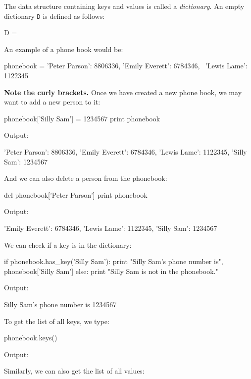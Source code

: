 The data structure containing keys and values is called a {\em dictionary}. 
An empty dictionary {\tt D} is defined as follows:

\begin{bluecode}
D = {}
\end{bluecode}
An example of a phone book would be:

\begin{bluecode}
phonebook = {'Peter Parson': 8806336, 'Emily Everett': 6784346, \
'Lewis Lame': 1122345}
\end{bluecode}
{\bf Note the curly brackets.} 
Once we have created a new phone book, we may want to add a new person to it:

\begin{bluecode}
phonebook['Silly Sam'] = 1234567
print phonebook
\end{bluecode}
Output:

\begin{bluecode}
{'Peter Parson': 8806336, 'Emily Everett': 6784346,
'Lewis Lame': 1122345, 'Silly Sam': 1234567}
\end{bluecode}
And we can also delete a person from the phonebook:

\begin{bluecode}
del phonebook['Peter Parson']
print phonebook
\end{bluecode}
Output:

\begin{bluecode}
{'Emily Everett': 6784346, 'Lewis Lame': 1122345, 
'Silly Sam': 1234567}
\end{bluecode}
We can check if a key is in the dictionary:

\begin{bluecode}
if phonebook.has_key('Silly Sam'):
    print "Silly Sam's phone number is", phonebook['Silly Sam']
else:
    print "Silly Sam is not in the phonebook."
\end{bluecode}
Output:

\begin{bluecode}
Silly Sam's phone number is 1234567
\end{bluecode}
To get the list of all keys, we type:

\begin{bluecode}
phonebook.keys()
\end{bluecode}
Output:

\begin{bluecode}
\end{bluecode}
Similarly, we can also get the list of all values:

